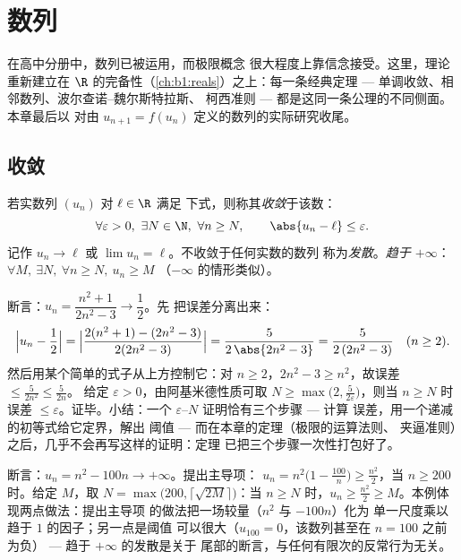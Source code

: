 \chapter{数列}\label{ch:b1:seq}

在高中分册中，数列已被运用，而极限概念
很大程度上靠信念接受。这里，理论重新建立在
$\R$ 的完备性（\cref{ch:b1:reals}）之上：每一条经典定理
--- 单调收敛、相邻数列、波尔查诺--魏尔斯特拉斯、
柯西准则 --- 都是这同一条公理的不同侧面。本章最后以
对由 $u_{n+1} =
f(u_n)$ 定义的数列的实际研究收尾。

\section{收敛}

\begin{definition}[数列的极限]\label{def:b1:seq:limit}
若实数列 $(u_n)$ 对 $\ell \in \R$ 满足
下式，则称其\emph{收敛}于该数：
\[
\forall \varepsilon > 0,\ \exists N \in \N,\ \forall n \geq N,
\qquad \abs{u_n - \ell} \leq \varepsilon .
\]
记作 $u_n \to \ell$ 或 $\lim u_n = \ell$。不收敛于任何实数的数列
称为\emph{发散}。\emph{趋于
$+\infty$}：$\forall M,\ \exists N,\ \forall n \geq N,\ u_n \geq M$
（$-\infty$ 的情形类似）。
\end{definition}

\begin{example}\label{ex:b1:seq:epsilonN}
断言：$u_n = \dfrac{n^2 + 1}{2n^2 - 3} \to \dfrac12$。先
把误差分离出来：
\[
\Bigl| u_n - \frac12 \Bigr|
= \Bigl| \frac{2(n^2 + 1) - (2n^2 - 3)}{2(2n^2 - 3)} \Bigr|
= \frac{5}{2\,\abs{2n^2 - 3}}
= \frac{5}{2\,(2n^2 - 3)} \quad (n \geq 2).
\]
然后用某个简单的式子从上方控制它：对 $n \geq 2$，$2n^2 - 3
\geq n^2$，故误差 $\leq \frac{5}{2n^2} \leq \frac 5{2n}$。
给定 $\varepsilon > 0$，由阿基米德性质可取 $N \geq
\max\bigl(2, \frac{5}{2\varepsilon}\bigr)$，则当 $n \geq N$ 时
误差 $\leq \varepsilon$。证毕。小结：一个
$\varepsilon$--$N$ 证明恰有三个步骤 --- 计算
误差，用一个递减的初等式给它定界，解出
阈值 --- 而在本章的定理（极限的运算法则、
夹逼准则）之后，几乎不会再写这样的证明：定理
已把三个步骤一次性打包好了。
\end{example}

\begin{example}\label{ex:b1:seq:toinfinity}
断言：$u_n = n^2 - 100n \to +\infty$。提出主导项：
$u_n = n^2\bigl(1 - \frac{100}{n}\bigr) \geq \frac{n^2}{2}$，当
$n \geq 200$ 时。给定 $M$，取 $N = \max\bigl(200,
\lceil\sqrt{2M}\rceil\bigr)$：当 $n \geq N$ 时，$u_n \geq
\frac{n^2}{2} \geq M$。本例体现两点做法：提出主导项
的做法把一场较量（$n^2$ 与 $-100n$）化为
单一尺度乘以趋于 $1$ 的因子；另一点是阈值
可以很大（$u_{100} = 0$，该数列甚至在
$n = 100$ 之前为负） --- 趋于 $+\infty$ 的发散是关于
尾部的断言，与任何有限次的反常行为无关。
\end{example}

